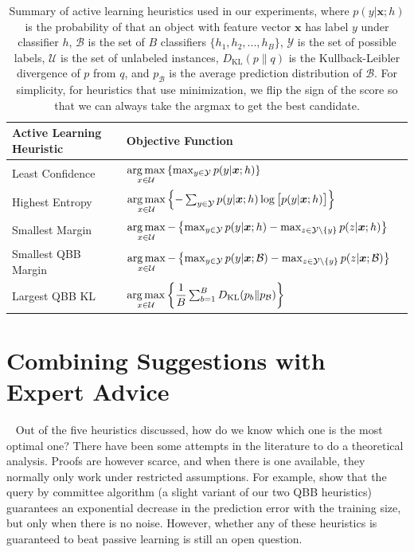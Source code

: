 \documentclass[fleqn,10pt,lineno]{wlpeerj} %
\newcommand{\B}{\mathcal{B}}
\newcommand{\Y}{\mathcal{Y}}
\newcommand{\Unlabelled}{\mathcal{U}}
\newcommand*{\argmax}{\operatornamewithlimits{arg\,max}\limits}
\begin{document}
\begin{table}[h]
	\caption {Summary of active learning heuristics used in our experiments,
			  where $p(y | \bm{x}; h)$ is the probability of that an object
			  with feature vector $\bm{x}$ has label $y$ under classifier $h$,
			  $\B$ is the set of $B$ classifiers $\{h_1, h_2, ..., h_B\}$, $\Y$
			  is the set of possible labels, $\Unlabelled$ is the set of
			  unlabeled instances, $D_{\mathrm{KL}}(p\|q)$ is the
			  Kullback-Leibler divergence of $p$ from $q$, and $p_\B$ is the
			  average prediction distribution of $\B$. For simplicity,
			  for heuristics that use minimization, we flip the sign of the
			  score so that we can always take the argmax to get the best
			  candidate.}
	\label{tab:heuristics}
	\centering
	\begin{tabular}{lll}
		\toprule
		{Active Learning Heuristic}  &  Objective Function  \\
		\midrule
        Least Confidence &
			$\argmax_{x \in \Unlabelled}
			\left\{ \max_{y \in \Y} p(y | \bm{x}; h) \right\}$ \\
		Highest Entropy &
			$\argmax_{x \in \Unlabelled} \left\{-\sum_{y \in \Y} p(y | \bm{x}; h)
            \log \big[ p(y | \bm{x}; h) \big] \right\}$
			\\[2ex]
		Smallest Margin &
			$\argmax_{x \in \Unlabelled} - \left\{ \max_{y \in \Y} p(y | \bm{x}; h) -
            \max_{z \in \Y \setminus \{y\}} p(z | \bm{x}; h)  \right\}$
			\\[2ex]
		Smallest QBB Margin &
			$\argmax_{x \in \Unlabelled} - \left\{ \max_{y \in \Y} p(y | \bm{x}; \B) -
            \max_{z \in \Y \setminus \{y\}} p(z | \bm{x}; \B)  \right\}$
			\\[2ex]
		Largest QBB KL &
			$\argmax_{x \in \Unlabelled} \left\{ \dfrac{1}{B}
               \sum_{b=1}^B D_{\mathrm{KL}}(p_b\|p_\B) \right\}$
			\\
		\bottomrule
	\end{tabular}
\end{table}

\section{Combining Suggestions with Expert Advice}~\label{sec:expert}
Out of the five heuristics discussed, how do we know which one is the most
optimal one? There have been some attempts in the literature to do a
theoretical analysis. Proofs are however scarce, and when there is one
available, they normally only work under restricted assumptions. For example,
\cite{freund97} show that the query by committee algorithm (a slight variant of
our two QBB heuristics) guarantees an exponential decrease in the prediction
error with the training size, but only when there is no noise. However, whether
any of these heuristics is guaranteed to beat passive learning is still an open
question.
\end{document}
